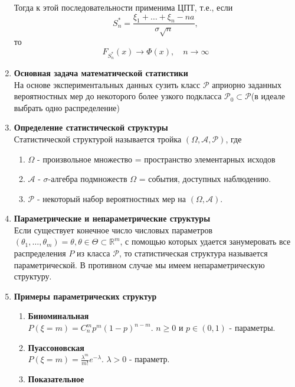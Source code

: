 \documentclass[A4]{article}
\begin{document}
\begin{enumerate}
	Тогда к этой последовательности применима ЦПТ, т.е., если 
	\begin{equation}
	S_n^*=\frac{\xi_1+\ldots+\xi_n-na}{\sigma\sqrt{n}},
	\end{equation}
	то
	\begin{equation}
	F_{S_n^*}(x)\rightarrow \Phi(x),\quad n\rightarrow \infty
	\end{equation}
	\item \textbf{Основная задача математической статистики}\\
	На основе экспериментальных данных сузить класс $\mathcal{P}$ априорно заданных вероятностных мер до некоторого более узкого подкласса $\mathcal{P}_0\subset \mathcal{P}$(в идеале выбрать одно распределение)
	\item \textbf{Определение статистической структуры}\\
	Статистической структурой называется тройка $(\Omega,\mathcal{A},\mathcal{P})$, где 
	\begin{enumerate}
		\item $\Omega$ - произвольное множество = пространство  элементарных исходов
		\item $\mathcal{A}$ - $\sigma$-алгебра подмножеств $\Omega$ = события, доступных наблюдению.
		\item $\mathcal{P}$ - некоторый набор вероятностных мер на $(\Omega,\mathcal{A})$.
	\end{enumerate}
	\item \textbf{Параметрические и непараметрические структуры}\\
	Если существует конечное число числовых параметров $(\theta_1,\ldots,\theta_m)=\theta,\theta\in\Theta\subset \mathbb{R}^m$, с помощью которых удается занумеровать все распределения $P$ из класса $\mathcal{P}$, то статистическая структура называется параметрической. В противном случае мы имеем непараметрическую структуру.
	\item \textbf{Примеры параметрических структур}
	\begin{enumerate}
		\item \textbf{Биноминальная}\\
		$P(\xi=m)=C_n^mp^m(1-p)^{n-m}$. $n\ge0$ и $p\in(0,1)$ - параметры.
		\item \textbf{Пуассоновская}\\
		$P(\xi=m)=\frac{\lambda^m}{m!}e^{-\lambda}$. $\lambda>0$ - параметр. 
		\item \textbf{Показательное}\\
		\begin{equation}

\end{equation}
\end{enumerate}
\end{enumerate}
\end{document}
